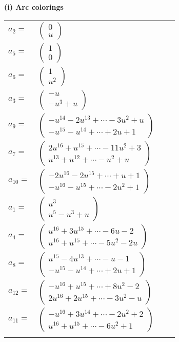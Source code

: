\documentclass[1p]{elsarticle_modified}
\theoremstyle{definition}
\begin{document}
\flushleft \textbf{(i) Arc colorings}\\
\begin{tabular}{m{7pt} m{180pt} m{7pt} m{180pt} }
\flushright $a_{2}=$&$\begin{pmatrix}0\\u\end{pmatrix}$ \\
\flushright $a_{5}=$&$\begin{pmatrix}1\\0\end{pmatrix}$ \\
\flushright $a_{6}=$&$\begin{pmatrix}1\\u^2\end{pmatrix}$ \\
\flushright $a_{3}=$&$\begin{pmatrix}- u\\- u^3+u\end{pmatrix}$ \\
\flushright $a_{9}=$&$\begin{pmatrix}- u^{14}-2 u^{13}+\cdots-3 u^2+u\\- u^{15}- u^{14}+\cdots+2 u+1\end{pmatrix}$ \\
\flushright $a_{7}=$&$\begin{pmatrix}2 u^{16}+u^{15}+\cdots-11 u^2+3\\u^{13}+u^{12}+\cdots- u^2+u\end{pmatrix}$ \\
\flushright $a_{10}=$&$\begin{pmatrix}-2 u^{16}-2 u^{15}+\cdots+u+1\\- u^{16}- u^{15}+\cdots-2 u^2+1\end{pmatrix}$ \\
\flushright $a_{1}=$&$\begin{pmatrix}u^3\\u^5- u^3+u\end{pmatrix}$ \\
\flushright $a_{4}=$&$\begin{pmatrix}u^{16}+3 u^{15}+\cdots-6 u-2\\u^{16}+u^{15}+\cdots-5 u^2-2 u\end{pmatrix}$ \\
\flushright $a_{8}=$&$\begin{pmatrix}u^{15}-4 u^{13}+\cdots- u-1\\- u^{15}- u^{14}+\cdots+2 u+1\end{pmatrix}$ \\
\flushright $a_{12}=$&$\begin{pmatrix}- u^{16}+u^{15}+\cdots+8 u^2-2\\2 u^{16}+2 u^{15}+\cdots-3 u^2- u\end{pmatrix}$ \\
\flushright $a_{11}=$&$\begin{pmatrix}- u^{16}+3 u^{14}+\cdots-2 u^2+2\\u^{16}+u^{15}+\cdots-6 u^2+1\end{pmatrix}$\\&\end{tabular}
\end{document}
